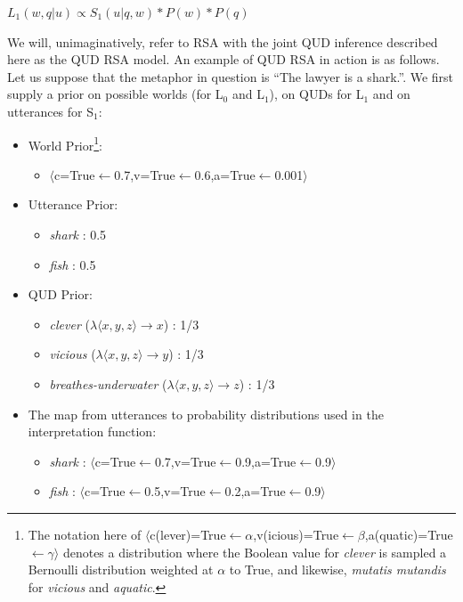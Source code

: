 \documentclass[10pt,letterpaper,twocolumn]{article}
\begin{document}
\begin{exe}
\ex $L_1(w,q\vert u) \propto S_1(u\vert q,w)*P(w)*P(q)$
\end{exe}

We will, unimaginatively, refer to RSA with the joint QUD inference described here as the QUD RSA model. An example of QUD RSA in action is as follows. Let us suppose that the metaphor in question is ``The lawyer is a shark.''. We first supply a prior on possible worlds (for L$_0$ and L$_1$), on QUDs for L$_1$ and on utterances for S$_1$:

\begin{itemize}
\item World Prior\footnote{The notation here of $\langle$c(lever)=True$\leftarrow\alpha$,v(icious)=True$\leftarrow\beta$,a(quatic)=True$\leftarrow\gamma\rangle$ denotes a distribution where the Boolean value for \emph{clever} is sampled a Bernoulli distribution weighted at $\alpha$ to True, and likewise, \emph{mutatis mutandis} for \emph{vicious} and \emph{aquatic}.}: 

\begin{itemize}

\item $\langle$c=True$\leftarrow$0.7,v=True$\leftarrow$0.6,a=True$\leftarrow$0.001$\rangle$
\end{itemize}
\item Utterance Prior:
\begin{itemize}
	\item \emph{shark} : 0.5
	\item \emph{fish} : 0.5
\end{itemize}
\item QUD Prior:
\begin{itemize}
\item \emph{clever} ($\lambda \langle x,y,z\rangle \to x$) : 1/3
\item \emph{vicious} ($\lambda \langle x,y,z\rangle \to y$) : 1/3
\item \emph{breathes-underwater} ($\lambda \langle x,y,z\rangle \to z$) : 1/3
\end{itemize}
\item The map from utterances to probability distributions used in the interpretation function:
\begin{itemize}
\item \emph{shark} : $\langle$c=True$\leftarrow$0.7,v=True$\leftarrow$0.9,a=True$\leftarrow$0.9$\rangle$
\item \emph{fish} : $\langle$c=True$\leftarrow$0.5,v=True$\leftarrow$0.2,a=True$\leftarrow$0.9$\rangle$
\end{itemize}
\end{itemize}
\end{document}
